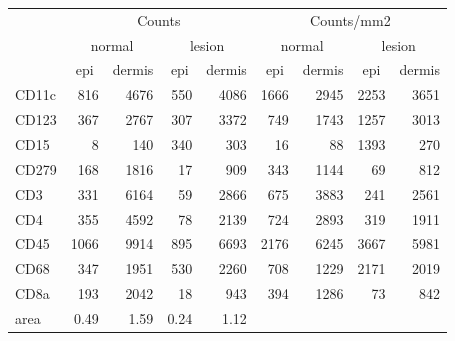 \documentclass{article}
\begin{document}
\begin{tabular}{lrrrr|rrrr}
   \hline
 
         \multicolumn{1}{c}{} & \multicolumn{4}{c|}{Counts} & \multicolumn{4}{c}{Counts/mm2} \\ 
         \multicolumn{1}{c}{} & \multicolumn{2}{c}{normal} & \multicolumn{2}{c|}{lesion} & \multicolumn{2}{c}{normal} & \multicolumn{2}{c}{lesion}  \\ 
         \multicolumn{1}{c}{} & \multicolumn{1}{c}{epi} & dermis & \multicolumn{1}{c}{epi} & \multicolumn{1}{c|}{dermis} & \multicolumn{1}{c}{epi} & dermis & \multicolumn{1}{c}{epi} & dermis  \\ 
         \hline
    CD11c & 816 & 4676 & 550 & 4086 & 1666 & 2945 & 2253 & 3651 \\ 
  CD123 & 367 & 2767 & 307 & 3372 & 749 & 1743 & 1257 & 3013 \\ 
  CD15 & 8 & 140 & 340 & 303 & 16 & 88 & 1393 & 270 \\ 
  CD279 & 168 & 1816 & 17 & 909 & 343 & 1144 & 69 & 812 \\ 
  CD3 & 331 & 6164 & 59 & 2866 & 675 & 3883 & 241 & 2561 \\ 
  CD4 & 355 & 4592 & 78 & 2139 & 724 & 2893 & 319 & 1911 \\ 
  CD45 & 1066 & 9914 & 895 & 6693 & 2176 & 6245 & 3667 & 5981 \\ 
  CD68 & 347 & 1951 & 530 & 2260 & 708 & 1229 & 2171 & 2019 \\ 
  CD8a & 193 & 2042 & 18 & 943 & 394 & 1286 & 73 & 842 \\ 
  area & 0.49 & 1.59 & 0.24 & 1.12 &    &    &    &    \\ 
   \hline
\end{tabular}
\end{document}
